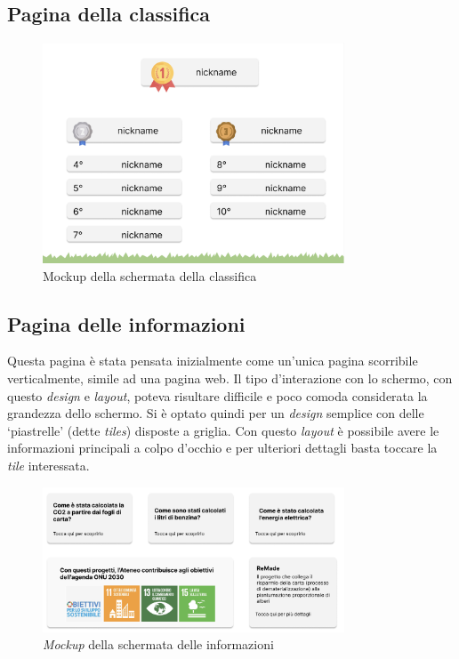 \subsection{Pagina della classifica}
\begin{figure}
    \centering
    \includegraphics[width=0.8\textwidth]{img/topchartPage.png}
    \caption{Mockup della schermata della classifica}
    \label{fig:chartPage}
\end{figure}
%
\subsection{Pagina delle informazioni}
Questa pagina è stata pensata inizialmente come un'unica pagina scorribile verticalmente, simile ad una pagina web. Il tipo d'interazione con lo schermo, con questo \textit{design} e \textit{layout}, poteva risultare difficile e poco comoda considerata la grandezza dello schermo.
Si è optato quindi per un \textit{design} semplice con delle \enquote*{piastrelle} (dette \textit{tiles}) disposte a griglia. Con questo \textit{layout} è possibile avere le informazioni principali a colpo d'occhio e per ulteriori dettagli basta toccare la \textit{tile} interessata.

\begin{figure} [h]
    \centering
    \includegraphics[width=0.8\textwidth]{img/infoPage.png}
    \caption{\textit{Mockup} della schermata delle informazioni}
    \label{fig:infoPage}
\end{figure}
%
%
%
